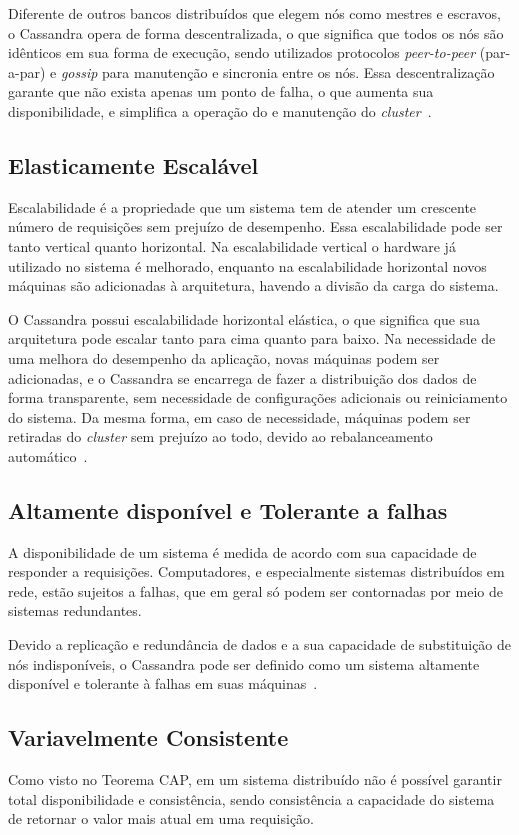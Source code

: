 Diferente de outros bancos distribuídos que elegem nós como mestres e escravos, o Cassandra opera de forma descentralizada, o que significa que todos os nós são idênticos em sua forma de execução, sendo utilizados protocolos \emph{peer-to-peer} (par-a-par) e \emph{gossip} para manutenção e sincronia entre os nós. Essa descentralização garante que não exista apenas um ponto de falha, o que aumenta sua disponibilidade, e simplifica a operação do e manutenção do \emph{cluster}~\cite{cassandraguide}.

\subsection*{Elasticamente Escalável}
Escalabilidade é a propriedade que um sistema tem de atender um crescente número de requisições sem prejuízo de desempenho. Essa escalabilidade pode ser tanto vertical quanto horizontal. Na escalabilidade vertical o hardware já utilizado no sistema é melhorado, enquanto na escalabilidade horizontal novos máquinas são adicionadas à arquitetura, havendo a divisão da carga do sistema.

O Cassandra possui escalabilidade horizontal elástica, o que significa que sua arquitetura pode escalar tanto para cima quanto para baixo. Na necessidade de uma melhora do desempenho da aplicação, novas máquinas podem ser adicionadas, e o Cassandra se encarrega de fazer a distribuição dos dados de forma transparente, sem necessidade de configurações adicionais ou reiniciamento do sistema. Da mesma forma, em caso de necessidade, máquinas podem ser retiradas do \emph{cluster} sem prejuízo ao todo, devido ao rebalanceamento automático~\cite{cassandraguide}.

\subsection*{Altamente disponível e Tolerante a falhas}
A disponibilidade de um sistema é medida de acordo com sua capacidade de responder a requisições. Computadores, e especialmente sistemas distribuídos em rede, estão sujeitos a falhas, que em geral só podem ser contornadas por meio de sistemas redundantes.

Devido a replicação e redundância de dados e a sua capacidade de substituição de nós indisponíveis, o Cassandra pode ser definido como um sistema altamente disponível e tolerante à falhas em suas máquinas~\cite{cassandraguide}.

\subsection*{Variavelmente Consistente}
Como visto no Teorema CAP, em um sistema distribuído não é possível garantir total disponibilidade e consistência, sendo consistência a capacidade do sistema de retornar o valor mais atual em uma requisição.

